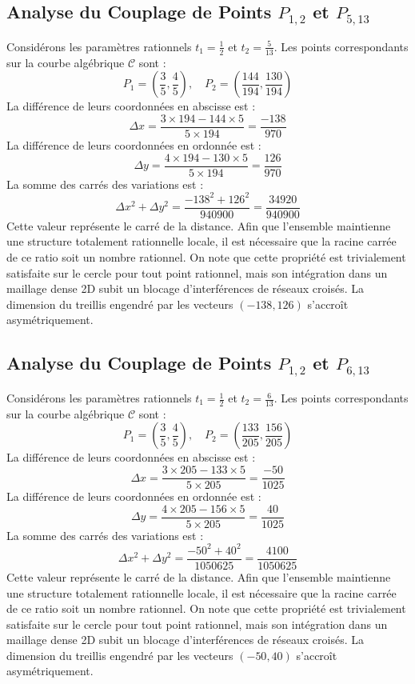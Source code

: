 \documentclass[12pt, a4paper]{article}
\begin{document}
\subsection{Analyse du Couplage de Points $P_{1,2}$ et $P_{5,13}$}
Considérons les paramètres rationnels $t_1 = \frac{1}{2}$ et $t_2 = \frac{5}{13}$.
Les points correspondants sur la courbe algébrique $\mathcal{C}$ sont :
$$ P_1 = \left( \frac{3}{5}, \frac{4}{5} \right), \quad P_2 = \left( \frac{144}{194}, \frac{130}{194} \right) $$
La différence de leurs coordonnées en abscisse est :
$$ \Delta x = \frac{3 \times 194 - 144 \times 5}{5 \times 194} = \frac{-138}{970} $$
La différence de leurs coordonnées en ordonnée est :
$$ \Delta y = \frac{4 \times 194 - 130 \times 5}{5 \times 194} = \frac{126}{970} $$
La somme des carrés des variations est :
$$ \Delta x^2 + \Delta y^2 = \frac{ -138^2 + 126^2 }{ 940900 } = \frac{ 34920 }{ 940900 } $$
Cette valeur représente le carré de la distance. Afin que l'ensemble maintienne une structure totalement rationnelle locale, il est nécessaire que la racine carrée de ce ratio soit un nombre rationnel. On note que cette propriété est trivialement satisfaite sur le cercle pour tout point rationnel, mais son intégration dans un maillage dense 2D subit un blocage d'interférences de réseaux croisés. La dimension du treillis engendré par les vecteurs $( -138, 126 )$ s'accroît asymétriquement.


\subsection{Analyse du Couplage de Points $P_{1,2}$ et $P_{6,13}$}
Considérons les paramètres rationnels $t_1 = \frac{1}{2}$ et $t_2 = \frac{6}{13}$.
Les points correspondants sur la courbe algébrique $\mathcal{C}$ sont :
$$ P_1 = \left( \frac{3}{5}, \frac{4}{5} \right), \quad P_2 = \left( \frac{133}{205}, \frac{156}{205} \right) $$
La différence de leurs coordonnées en abscisse est :
$$ \Delta x = \frac{3 \times 205 - 133 \times 5}{5 \times 205} = \frac{-50}{1025} $$
La différence de leurs coordonnées en ordonnée est :
$$ \Delta y = \frac{4 \times 205 - 156 \times 5}{5 \times 205} = \frac{40}{1025} $$
La somme des carrés des variations est :
$$ \Delta x^2 + \Delta y^2 = \frac{ -50^2 + 40^2 }{ 1050625 } = \frac{ 4100 }{ 1050625 } $$
Cette valeur représente le carré de la distance. Afin que l'ensemble maintienne une structure totalement rationnelle locale, il est nécessaire que la racine carrée de ce ratio soit un nombre rationnel. On note que cette propriété est trivialement satisfaite sur le cercle pour tout point rationnel, mais son intégration dans un maillage dense 2D subit un blocage d'interférences de réseaux croisés. La dimension du treillis engendré par les vecteurs $( -50, 40 )$ s'accroît asymétriquement.
\end{document}
